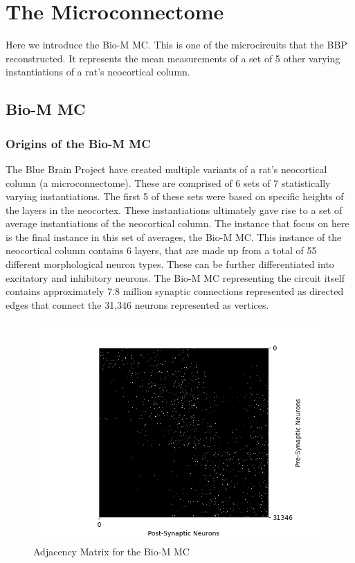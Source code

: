 \section{The Microconnectome}
Here we introduce the Bio-M MC. This is one of the microcircuits that the BBP reconstructed. It represents the mean measurements of a set of 5 other varying instantiations of a rat's neocortical column.
\subsection{Bio-M MC}
\subsubsection{Origins of the Bio-M MC}
The Blue Brain Project have created multiple variants of a rat's neocortical column (a microconnectome). These are  comprised of 6 sets of 7 statistically varying instantiations. The first 5 of these sets were based on specific heights of the layers in the neocortex. These instantiations ultimately gave rise to a set of average instantiations of the neocortical column. The instance that focus on here is the final instance in this set of averages, the Bio-M MC. This instance of the neocortical column contains 6 layers, that are made up from a total of 55 different morphological neuron types. These can be further differentiated into excitatory and inhibitory neurons. The Bio-M MC representing the circuit itself contains approximately 7.8 million synaptic connections represented as directed edges that connect the 31,346 neurons represented as vertices. 

\begin{figure}[H]
\begin{center}
\captionsetup{justification=centering}
\includegraphics[width=12cm]{BioM/matrix_BioM.png}
\caption{Adjacency Matrix for the Bio-M MC}
\end{center}
\end{figure}
